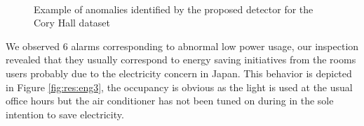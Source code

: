 \begin{figure}[t]
   \hspace{.015\textwidth}
 \hspace{.015\textwidth}
 \\ 
\caption{Example of anomalies identified by the proposed detector for the Cory Hall dataset}
\end{figure}

We observed 6 alarms corresponding to abnormal low power usage, our inspection revealed that they usually correspond to energy saving initiatives from the rooms users probably due to the electricity concern in Japan.
This behavior is depicted in Figure \ref{fig:res:eng3}, the occupancy is obvious as the light is used at the usual office hours but the air conditioner has not been tuned on during in the sole intention to save electricity.

